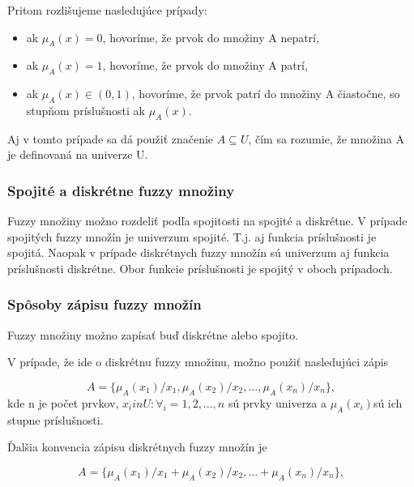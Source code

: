 Pritom rozlišujeme nasledujúce prípady: 
\begin{itemize}
	\item ak $\mu_A (x) = 0$, hovoríme, že prvok do množiny A nepatrí, 
	\item ak $\mu_A (x) = 1$, hovoríme, že prvok do množiny A patrí, 
	\item ak $\mu_A (x) \in (0, 1)$, hovoríme, že prvok patrí do množiny A čiastočne, so stupňom príslušnosti ak $\mu_A(x)$. 
\end{itemize}

Aj v tomto prípade sa dá použiť značenie $A\subseteq U$, čím sa rozumie, že množina A je definovaná na univerze U.  \cite{gregorUI} 

\subsubsection{Spojité a diskrétne fuzzy množiny}
Fuzzy množiny možno rozdeliť podľa spojitosti na spojité a diskrétne. V prípade spojitých fuzzy množín je univerzum spojité. T.j. aj funkcia príslušnosti je spojitá. Naopak v prípade diskrétnych fuzzy množín sú univerzum aj funkcia príslušnosti diskrétne. Obor funkcie príslušnosti je spojitý v oboch prípadoch.  \cite{gregorUI} 


\subsubsection{Spôsoby zápisu fuzzy množín}
Fuzzy množiny možno zapísať buď diskrétne alebo spojito.

V prípade, že ide o diskrétnu fuzzy množinu, možno použiť nasledujúci zápis \cite{gregorref1, gregorUI}

\begin{equation}\label{disk0}
A = \{\mu_A(x_1)/x_1, \mu_A(x_2)/x_2, ... , \mu_A(x_n)/x_n\}, 
\end{equation}
kde n je počet prvkov, $x_i in U : \forall_i = 1, 2, ..., n$ sú prvky univerza a $\mu_A(x_i)$sú ich stupne príslušnosti.

Ďalšia konvencia zápisu diskrétnych fuzzy množín je  \cite{gregorUI} 

\begin{equation}\label{disk1}
A = \{\mu_A(x_1)/x_1 + \mu_A(x_2)/x_2, ...  + \mu_A(x_n)/x_n\}, 
\end{equation}

